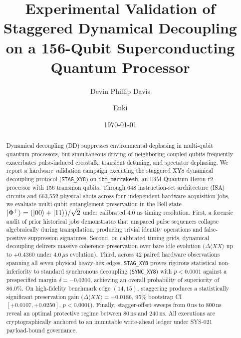 \documentclass[twocolumn,aps,pra,superscriptaddress,showpacs,floatfix]{revtex4-2}
\begin{document}
\title{Experimental Validation of Staggered Dynamical Decoupling on a 156-Qubit Superconducting Quantum Processor}

\author{Devin Phillip Davis}

\author{Enki}

\date{\today}

\begin{abstract}
Dynamical decoupling (DD) suppresses environmental dephasing in multi-qubit quantum processors, but simultaneous driving of neighboring coupled qubits frequently exacerbates pulse-induced crosstalk, transient detuning, and spectator dephasing. We report a hardware validation campaign executing the staggered XY8 dynamical decoupling protocol (\texttt{STAG\_XY8}) on \texttt{ibm\_marrakesh}, an IBM Quantum Heron r2 processor with 156 transmon qubits. Through 648 instruction-set architecture (ISA) circuits and 663,552 physical shots across four independent hardware acquisition jobs, we evaluate multi-qubit entanglement preservation in the Bell state $\ket{\Phi^+} = (\ket{00} + \ket{11})/\sqrt{2}$ under calibrated $4.0\text{ ns}$ timing resolution. First, a forensic audit of prior historical jobs demonstrates that unspaced pulse sequences collapse algebraically during transpilation, producing trivial identity operations and false-positive suppression signatures. Second, on calibrated timing grids, dynamical decoupling delivers massive coherence preservation over bare idle evolution ($\Delta \langle XX \rangle$ up to $+0.4360$ under $4.0\,\mu\mathrm{s}$ evolution). Third, across 42 paired hardware observations spanning all seven physical heavy-hex edges, \texttt{STAG\_XY8} proves rigorous statistical non-inferiority to standard synchronous decoupling (\texttt{SYNC\_XY8}) with $p < 0.0001$ against a prespecified margin $\delta = -0.0200$, achieving an overall probability of superiority of $86.0\%$. On high-fidelity benchmark edge $(14, 15)$, staggering produces a statistically significant preservation gain ($\Delta \langle XX \rangle = +0.0186$, 95\% bootstrap CI $[+0.0107, +0.0250]$, $p < 0.0001$). Finally, stagger-offset sweeps from $0\,\mathrm{ns}$ to $800\,\mathrm{ns}$ reveal an optimal protective regime between $80\,\mathrm{ns}$ and $240\,\mathrm{ns}$. All executions are cryptographically anchored to an immutable write-ahead ledger under SYS-021 payload-bound governance.
\end{abstract}
\end{document}
